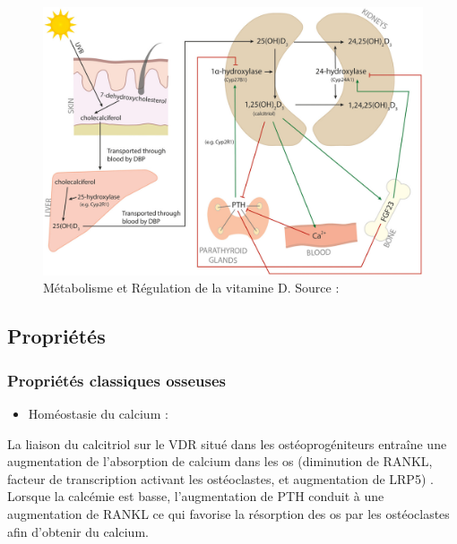 \documentclass[
  letterpaper,
  DIV=11,
  numbers=noendperiod]{scrartcl}
\providecommand{\tightlist}{%
  \setlength{\itemsep}{0pt}\setlength{\parskip}{0pt}}\usepackage{longtable,booktabs,array}
\begin{document}
\begin{figure}

{\centering \includegraphics{figures/vitamin-d-metabolism-regulation.jpg}

}

\caption{\label{fig-reg-vitd}Métabolisme et Régulation de la vitamine D.
Source : \textcite{Dankers.2017}}

\end{figure}

\hypertarget{propriuxe9tuxe9s}{%
\subsection{Propriétés}\label{propriuxe9tuxe9s}}

\hypertarget{propriuxe9tuxe9s-classiques-osseuses}{%
\subsubsection{Propriétés classiques
osseuses}\label{propriuxe9tuxe9s-classiques-osseuses}}

\begin{itemize}
\tightlist
\item
  Homéostasie du calcium :
\end{itemize}

La liaison du calcitriol sur le VDR situé dans les ostéoprogéniteurs
entraîne une augmentation de l'absorption de calcium dans les os
(diminution de RANKL, facteur de transcription activant les
ostéoclastes, et augmentation de LRP5) \autocite{Carmeliet.2015}.
Lorsque la calcémie est basse, l'augmentation de PTH conduit à une
augmentation de RANKL ce qui favorise la résorption des os par les
ostéoclastes afin d'obtenir du calcium.
\end{document}
